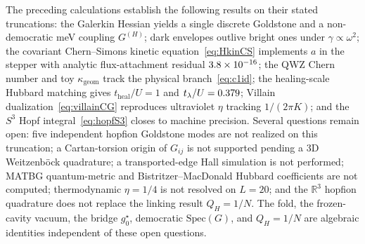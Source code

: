 The preceding calculations establish the following results on their stated truncations: the Galerkin Hessian yields a single discrete Goldstone and a non-democratic meV coupling $G^{(H)}$; dark envelopes outlive bright ones under $\gamma\propto\omega^2$; the covariant Chern--Simons kinetic equation~\eqref{eq:HkinCS} implements $a$ in the stepper with analytic flux-attachment residual $3.8\times 10^{-16}$; the QWZ Chern number and toy $\kappa_{\mathrm{geom}}$ track the physical branch~\eqref{eq:c1id}; the healing-scale Hubbard matching gives $t_{\mathrm{heal}}/U=1$ and $t_\lambda/U=0.379$; Villain dualization~\eqref{eq:villainCG} reproduces ultraviolet $\eta$ tracking $1/(2\pi K)$; and the $S^3$ Hopf integral~\eqref{eq:hopfS3} closes to machine precision. Several questions remain open: five independent hopfion Goldstone modes are not realized on this truncation; a Cartan-torsion origin of $G_{ij}$ is not supported pending a 3D Weitzenb\"ock quadrature; a transported-edge Hall simulation is not performed; MATBG quantum-metric and Bistritzer--MacDonald Hubbard coefficients are not computed; thermodynamic $\eta=1/4$ is not resolved on $L=20$; and the $\mathbb{R}^3$ hopfion quadrature does not replace the linking result $Q_H=1/N$. The fold, the frozen-cavity vacuum, the bridge $g_0^\star$, democratic $\mathrm{Spec}(G)$, and $Q_H=1/N$ are algebraic identities independent of these open questions.

